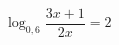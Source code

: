 \begin{ex}[type=equation]
	\begin{condition}
		$\log_{0,6} \dfrac{3x + 1}{2x}= 2$
	\end{condition}
\end{ex}